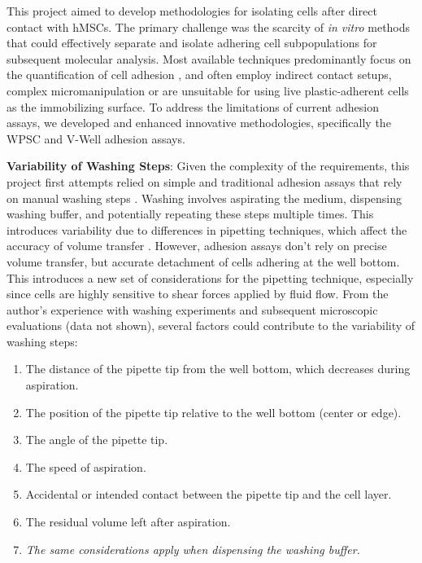



%
\label{sec:discussion_novel_methods}%
This project aimed to develop methodologies for isolating cells after direct
contact with \acp{hMSC}. The primary challenge was the scarcity of \textit{in
vitro} methods that could effectively separate and isolate adhering cell
subpopulations for subsequent molecular analysis. Most available techniques
predominantly focus on the quantification of cell adhesion
\cite{khaliliReviewCellAdhesion2015, kashefQuantitativeMethodsAnalyzing2015},
and often employ indirect contact setups, complex micromanipulation
 or are unsuitable for using
live plastic-adherent cells as the immobilizing surface. To address the limitations of
current adhesion assays, we developed and enhanced innovative methodologies,
specifically the \acf{WPSC} and V-Well adhesion assays.

\textbf{Variability of Washing Steps}: Given the complexity of the requirements,
this project first attempts relied on simple and traditional adhesion assays
that rely on manual washing steps \cite{humphriesCellAdhesionAssays2009}.
Washing involves aspirating the medium, dispensing washing buffer, and
potentially repeating these steps multiple times. This introduces variability
due to differences in pipetting techniques, which affect the accuracy of volume
transfer \cite{guanAssessingVariationsManual2023,
      pushparajRevisitingMicropipettingTechniques2020}. However, adhesion assays don't
rely on precise volume transfer, but accurate detachment of cells adhering at
the well bottom. This introduces a new set of considerations for the pipetting
technique, especially since cells are highly sensitive to shear forces applied
by fluid flow. From the author's experience with washing experiments and
subsequent microscopic evaluations (data not shown), several factors could
contribute to the variability of washing steps:
\begin{enumerate}
      \item The distance of the pipette tip from the well bottom, which
            decreases during aspiration.
      \item The position of the pipette tip relative to the well bottom (center or edge).
      \item The angle of the pipette tip.
      \item The speed of aspiration.
      \item Accidental or intended contact between the pipette tip and the cell layer.
      \item The residual volume left after aspiration.
      \item \textit{The same considerations apply when dispensing the washing buffer.}
\end{enumerate}



